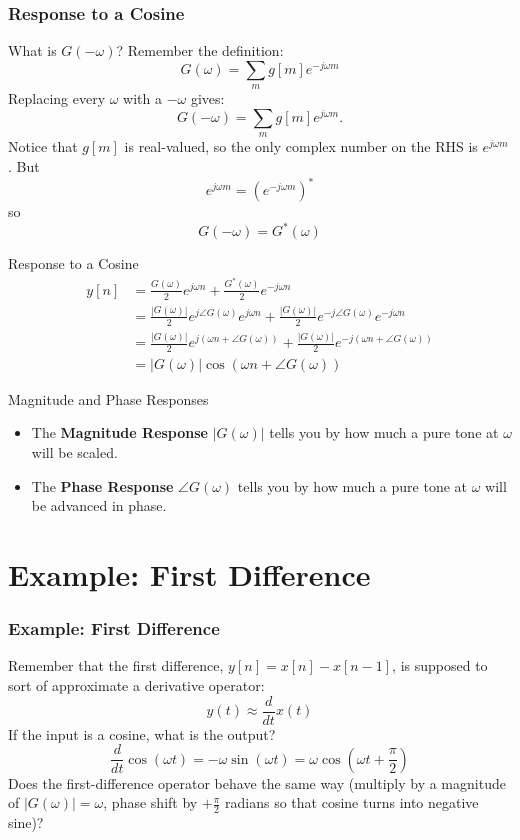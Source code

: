 \documentclass{beamer}
\begin{document}
\begin{frame}
  \frametitle{Response to a Cosine}
  What is $G(-\omega)$?  Remember the definition:
  \[
  G(\omega) = \sum_m g[m] e^{-j\omega m}
  \]
  Replacing every $\omega$ with a  $-\omega$ gives:
  \[
  G(-\omega) = \sum_m g[m] e^{j\omega m}.
  \]
  Notice that $g[m]$ is real-valued, so the only complex number on the RHS  is $e^{j\omega m}$.  But
  \[
  e^{j\omega m}=\left(e^{-j\omega m}\right)^*
  \]
  so
  \[
  G(-\omega) = G^*(\omega)
  \]
\end{frame}

\begin{frame}
  \begin{block}{Response to a Cosine}
    \begin{align*}
      y[n] &= \frac{G(\omega)}{2}e^{j\omega n}+\frac{G^*(\omega)}{2}e^{-j\omega n}\\
      &= \frac{|G(\omega)|}{2}e^{j\angle G(\omega)}e^{j\omega n} + 
      \frac{|G(\omega)|}{2}e^{-j\angle G(\omega)}e^{-j\omega n}\\
      &= \frac{|G(\omega)|}{2}e^{j\left(\omega n+\angle G(\omega)\right)} +
      \frac{|G(\omega)|}{2}e^{-j\left(\omega n+\angle G(\omega)\right)}\\
      &= |G(\omega)|\cos\left(\omega n+\angle G(\omega)\right)
    \end{align*}
  \end{block}
  \begin{block}{Magnitude and Phase Responses}
    \begin{itemize}
    \item The {\bf Magnitude Response} $|G(\omega)|$ tells you by how
      much a pure tone at $\omega$ will be scaled.
    \item The {\bf Phase Response} $\angle G(\omega)$ tells you by how much
      a pure tone at $\omega$ will be advanced in phase.
    \end{itemize}
  \end{block}
\end{frame}

\section[Example]{Example: First Difference}
\setcounter{subsection}{1}

\begin{frame}
  \frametitle{Example: First Difference}

  Remember that the first difference, $y[n]=x[n]-x[n-1]$, is supposed
  to sort of approximate a derivative operator:
  \[
  y(t) \approx \frac{d}{dt} x(t)
  \]
  If the input is a cosine, what is the output?
  \[
  \frac{d}{dt} \cos\left(\omega t\right) = -\omega \sin\left(\omega t\right)
  = \omega \cos\left(\omega t+\frac{\pi}{2}\right)
  \]
  Does the first-difference operator behave the same way (multiply by
  a magnitude of $|G(\omega)|=\omega$, phase shift by $+\frac{\pi}{2}$
  radians so that cosine turns into negative sine)?
\end{frame}
\end{document}
